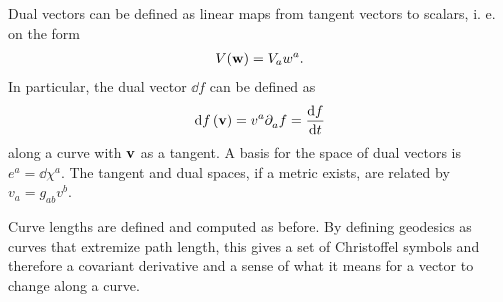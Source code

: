 Dual vectors can be defined as linear maps from tangent vectors to scalars, i. e. on the form
\begin{align*}
	V(\vb{w}) = V_{a}w^{a}.
\end{align*}
In particular, the dual vector $\dd{f}$ can be defined as
\begin{align*}
	\dd{f}(\vb{v}) = v^{a}\partial^{}_{a}f = \dv{f}{t}
\end{align*}
along a curve with $\vb{v}$ as a tangent. A basis for the space of dual vectors is $e^{a} = \dd{\chi^{a}}$. The tangent and dual spaces, if a metric exists, are related by $v_{a} = g_{ab}v^{b}$.

Curve lengths are defined and computed as before. By defining geodesics as curves that extremize path length, this gives a set of Christoffel symbols and therefore a covariant derivative and a sense of what it means for a vector to change along a curve.